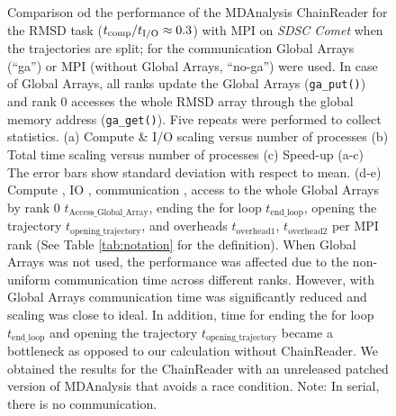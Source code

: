 \begin{figure}[ht!]
\caption{Comparison od the performance of the MDAnalysis ChainReader for the RMSD task (${t}_{\text{comp}}/{t}_{\text{I/O}} \approx 0.3$)  with MPI on \emph{SDSC Comet} when the trajectories are split; for the communication Global Arrays (``ga'') or MPI (without Global Arrays, ``no-ga'') were used.
In case of Global Arrays, all ranks update the Global Arrays (\texttt{ga\_put()}) and rank 0 accesses the whole RMSD array through the global memory address (\texttt{ga\_get()}).
Five repeats were performed to collect statistics. (a) Compute \& I/O scaling versus number of processes (b) Total time scaling versus number of processes (c) Speed-up (a-c) The error bars show standard deviation with respect to mean. (d-e) Compute \tcomp, IO \tIO, communication \tcomm, access to the whole Global Arrays by rank 0 $t_{\text{Access\_Global\_Array}}$, ending the for loop $t_{\text{end\_loop}}$,
  opening the trajectory $t_{\text{opening\_trajectory}}$, and overheads $t_{\text{overhead1}}$, $t_{\text{overhead2}}$ per MPI rank (See Table \ref{tab:notation} for the definition). When Global Arrays was not used, the performance was affected due to the non-uniform communication time across different ranks. However, with Global Arrays communication time was significantly reduced and scaling was close to ideal. In addition, time for ending the for loop $t_{\text{end\_loop}}$ and 
opening the trajectory $t_{\text{opening\_trajectory}}$ became a bottleneck as opposed to our calculation without ChainReader. We obtained the results for the ChainReader with an unreleased patched version of MDAnalysis that avoids a race condition. Note: In serial, there is no communication.}
\label{fig:MPIwithIO-split-chain-reader}
\end{figure}

